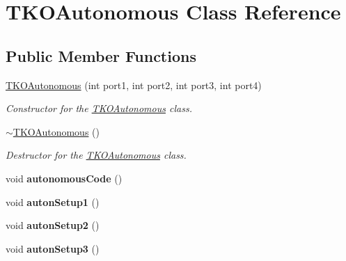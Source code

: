 \hypertarget{classTKOAutonomous}{\section{\-T\-K\-O\-Autonomous \-Class \-Reference}
\label{classTKOAutonomous}
}
\subsection*{\-Public \-Member \-Functions}
\begin{DoxyCompactItemize}
\item 
\hypertarget{classTKOAutonomous_a33defff4f796ecb1ebaba6d1f041d984}{\hyperlink{classTKOAutonomous_a33defff4f796ecb1ebaba6d1f041d984}{\-T\-K\-O\-Autonomous} (int port1, int port2, int port3, int port4)}\label{classTKOAutonomous_a33defff4f796ecb1ebaba6d1f041d984}

\begin{DoxyCompactList}\small\item\em \-Constructor for the \hyperlink{classTKOAutonomous}{\-T\-K\-O\-Autonomous} class. \end{DoxyCompactList}\item 
\hypertarget{classTKOAutonomous_a15b1fd854839566dd03f4a637a6b44b8}{\hyperlink{classTKOAutonomous_a15b1fd854839566dd03f4a637a6b44b8}{$\sim$\-T\-K\-O\-Autonomous} ()}\label{classTKOAutonomous_a15b1fd854839566dd03f4a637a6b44b8}

\begin{DoxyCompactList}\small\item\em \-Destructor for the \hyperlink{classTKOAutonomous}{\-T\-K\-O\-Autonomous} class. \end{DoxyCompactList}\item 
\hypertarget{classTKOAutonomous_a4166b99f61b3cc4a9978d09d66b73759}{void {\bfseries autonomous\-Code} ()}\label{classTKOAutonomous_a4166b99f61b3cc4a9978d09d66b73759}

\item 
\hypertarget{classTKOAutonomous_a780b4828c7cfb73ca98fd187be05b88d}{void {\bfseries auton\-Setup1} ()}\label{classTKOAutonomous_a780b4828c7cfb73ca98fd187be05b88d}

\item 
\hypertarget{classTKOAutonomous_a4e2c831641662e9bc8759c9963d8d0b5}{void {\bfseries auton\-Setup2} ()}\label{classTKOAutonomous_a4e2c831641662e9bc8759c9963d8d0b5}

\item 
\hypertarget{classTKOAutonomous_a64eaa8cc0be2a741e7e2b5e96385a912}{void {\bfseries auton\-Setup3} ()}\label{classTKOAutonomous_a64eaa8cc0be2a741e7e2b5e96385a912}


\end{DoxyCompactItemize}
